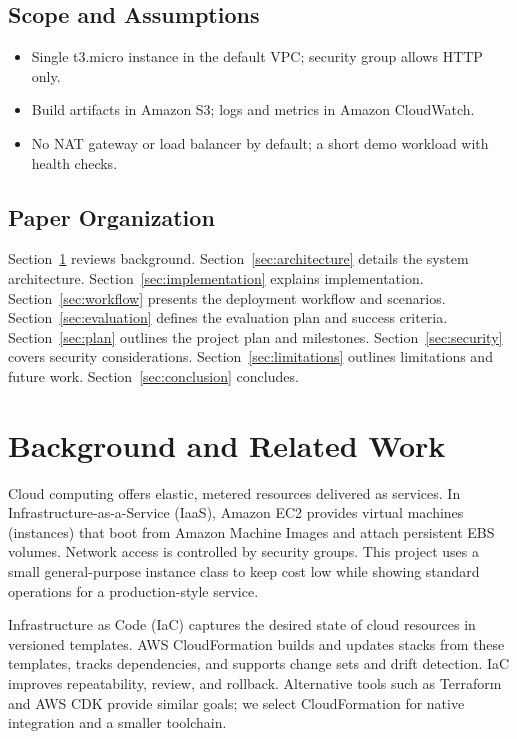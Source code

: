 \documentclass[12pt]{article}
\begin{document}
\subsection{Scope and Assumptions}
\begin{itemize}
\item Single t3.micro instance in the default VPC; security group allows HTTP only.
\item Build artifacts in Amazon S3; logs and metrics in Amazon CloudWatch.
\item No NAT gateway or load balancer by default; a short demo workload with health checks.
\end{itemize}

\subsection{Paper Organization}
Section~\ref{sec:background} reviews background. Section~\ref{sec:architecture} details the system architecture. Section~\ref{sec:implementation} explains implementation. Section~\ref{sec:workflow} presents the deployment workflow and scenarios. Section~\ref{sec:evaluation} defines the evaluation plan and success criteria. Section~\ref{sec:plan} outlines the project plan and milestones. Section~\ref{sec:security} covers security considerations. Section~\ref{sec:limitations} outlines limitations and future work. Section~\ref{sec:conclusion} concludes.

\clearpage
\section{Background and Related Work}\label{sec:background}

Cloud computing offers elastic, metered resources delivered as services. In Infrastructure-as-a-Service (IaaS), Amazon EC2 provides virtual machines (instances) that boot from Amazon Machine Images and attach persistent EBS volumes. Network access is controlled by security groups. This project uses a small general-purpose instance class to keep cost low while showing standard operations for a production-style service.

Infrastructure as Code (IaC) captures the desired state of cloud resources in versioned templates. AWS CloudFormation builds and updates stacks from these templates, tracks dependencies, and supports change sets and drift detection. IaC improves repeatability, review, and rollback. Alternative tools such as Terraform and AWS CDK provide similar goals; we select CloudFormation for native integration and a smaller toolchain.
\end{document}
